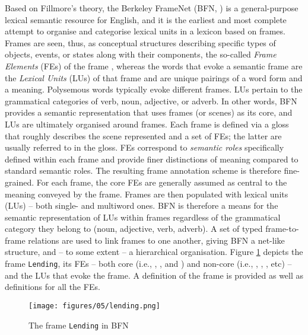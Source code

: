 \documentclass[output=paper,colorlinks,citecolor=brown]{langscibook}
\begin{document}
Based on Fillmore’s theory, the Berkeley FrameNet (BFN, \citealt{baker_etal_1998}) is a general-purpose lexical semantic resource for English, and it is the earliest and most complete attempt to organise and categorise lexical units in a lexicon based on frames. Frames are seen, thus, as conceptual structures describing specific types of objects, events, or states along with their components, the so-called {\em{Frame Elements}} (FEs) of the frame \citep{baker_etal_1998, ruppenhofer_etal_2016}, whereas the words that evoke a semantic frame are the {\em{Lexical Units}} (LUs) of that frame and are unique pairings of a word form and a meaning. Polysemous words typically evoke different frames. LUs pertain to the grammatical categories of verb, noun, adjective, or adverb.
In other words, BFN provides a semantic representation that uses frames (or scenes) as its core, and LUs are ultimately organised around frames. Each frame is defined via a gloss that roughly describes the scene represented and a set of FEs; the latter are usually referred to in the gloss. FEs correspond to {\em{semantic roles}} specifically defined within each frame and provide finer distinctions of meaning compared to standard semantic roles. The resulting frame annotation scheme is therefore fine-grained. For each frame, the core FEs are generally assumed as central to the meaning conveyed by the frame.
Frames are then populated with lexical units (LUs) -- both single- and multiword ones. BFN is therefore a means for the semantic representation of LUs within frames regardless of the grammatical category they belong to (noun, adjective, verb, adverb). A set of typed frame-to-frame relations are used to link frames to one another, giving BFN a net-like structure, and -- to some extent -- a hierarchical organisation. Figure \ref{fig:lending} depicts the frame \texttt{Lending}, its FEs -- both core (i.e., , , and ) and non-core (i.e., , , , etc) -- and the LUs that evoke the frame. A definition of the frame is provided as well as definitions for all the FEs.

\begin{figure}
    \centering
    \texttt{[image: figures/05/lending.png]}
    \caption{The frame \texttt{Lending} in BFN}
    \label{fig:lending}
\end{figure}
\end{document}
